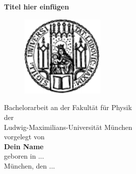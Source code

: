 \thispagestyle{empty}
\begin{center}
\begin{LARGE}
{\bf
\hspace*{1cm} Titel hier einfügen\\ [0.3cm]
}
\end{LARGE}
\vspace{0.5cm}
%
\begin{figure}[htbp]
  \begin{center}
  \hspace*{1cm}
     \includegraphics[height=4cm]{pics/lmu3.pdf}
  \end{center}
\end{figure}
% 
\vspace{1.0cm}
\begin{large}
\hspace*{1cm}Bachelorarbeit an der Fakultät für Physik \\
\hspace*{1cm}der \\
\hspace*{1cm}Ludwig-Maximilians-Universität München \\ [2.5cm]
\hspace*{1cm}vorgelegt von \\ 
{\bf
\hspace*{1cm}Dein Name     \\ }
\hspace*{1cm}geboren in ... \\ [0.5cm]
\hspace*{1cm}München, den ...
\end{large}
\end{center}

\setcounter{page}{0}

